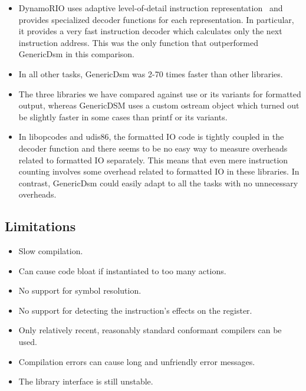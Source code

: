 \documentclass{article}
\begin{document}
\begin{itemize}
\item DynamoRIO uses adaptive level-of-detail instruction
  representation~\cite{bruening:dynamorio} and provides specialized
  decoder functions for each representation. In particular, it
  provides a very fast instruction decoder  which
  calculates only the next instruction address. This was the only
  function that outperformed GenericDsm in this comparison. 

\item In all other tasks, GenericDsm was 2-70 times faster than other
  libraries.

\item The three libraries we have compared against use  or its
  variants for formatted output, whereas GenericDSM uses a custom
  ostream object  which turned out be slightly faster in
  some cases than printf or its variants.

\item In libopcodes and udis86, the formatted IO code is tightly
  coupled in the decoder function and there seems to be no easy way to
  measure overheads related to formatted IO separately.  This means
  that even mere instruction counting involves some overhead related
  to formatted IO in these libraries.  In contrast, GenericDsm could
  easily adapt to all the tasks with no unnecessary overheads.
\end{itemize}

\subsection{Limitations}
\label{sec:limitations}

\begin{itemize}
\item Slow compilation.
\item Can cause code bloat if instantiated to too many actions.
\item No support for symbol resolution.
\item No support for detecting the instruction's effects on the  register. 
\item Only relatively recent, reasonably standard conformant compilers
  can be used.
\item Compilation errors can cause long and unfriendly error messages.
\item The library interface is still unstable.
\end{itemize}
\end{document}
